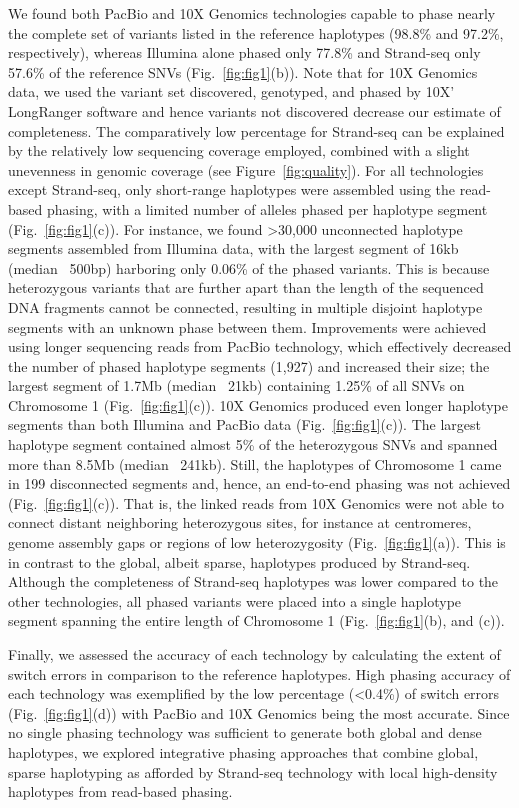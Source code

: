 	We found both PacBio and 10X Genomics technologies capable to phase nearly the complete set of variants listed in the reference haplotypes (98.8\% and 97.2\%, respectively), 
	whereas Illumina alone phased only 77.8\% and Strand-seq only 57.6\% of the reference SNVs (Fig.~\ref{fig:fig1}(b)). 
	Note that for 10X Genomics data, we used the variant set discovered, genotyped, and phased by 10X’ LongRanger software and hence variants not discovered decrease our estimate of completeness.
	The comparatively low percentage for Strand-seq can be explained by the relatively low sequencing coverage employed, combined with a slight unevenness in genomic coverage (see Figure~\ref{fig:quality}). 
	For all technologies except Strand-seq, only short-range haplotypes were assembled using the read-based phasing, with a limited number of alleles phased per haplotype segment (Fig.~\ref{fig:fig1}(c)). 
	For instance, we found >30,000 unconnected haplotype segments assembled from Illumina data, with the largest segment of 16kb (median ~500bp) harboring only 0.06\% of the phased variants. 
	This is because heterozygous variants that are further apart than the length of the sequenced DNA fragments cannot be connected, resulting in multiple disjoint haplotype segments with an unknown phase between them. 
	Improvements were achieved using longer sequencing reads from PacBio technology, which effectively decreased the number of phased haplotype segments (1,927) and increased their size; the largest segment of 1.7Mb (median ~21kb) 
	containing 1.25\% of all SNVs on Chromosome 1 (Fig.~\ref{fig:fig1}(c)). 10X Genomics produced even longer haplotype segments than both Illumina and PacBio data (Fig.~\ref{fig:fig1}(c)). 
	The largest haplotype segment contained almost 5\% of the heterozygous SNVs and spanned more than 8.5Mb (median ~241kb). Still, the haplotypes of Chromosome 1 came in 199 disconnected segments and, 
	hence, an end-to-end phasing was not achieved (Fig.~\ref{fig:fig1}(c)). That is, the linked reads from 10X Genomics were not able to connect distant neighboring heterozygous sites, for instance at centromeres, 
	genome assembly gaps or regions of low heterozygosity (Fig.~\ref{fig:fig1}(a)). 
	This is in contrast to the global, albeit sparse, haplotypes produced by Strand-seq. 
	Although the completeness of Strand-seq haplotypes was lower compared to the other technologies, all phased variants were placed into a single haplotype segment spanning the entire length of Chromosome 1 (Fig.~\ref{fig:fig1}(b), and (c)).	
	
	Finally, we assessed the accuracy of each technology by calculating the extent of switch errors in comparison to the reference haplotypes. High phasing accuracy of each technology was exemplified by the low percentage (<0.4\%) 
	of switch errors (Fig.~\ref{fig:fig1}(d)) with PacBio and 10X Genomics being the most accurate. 
	Since no single phasing technology was sufficient to generate both global and dense haplotypes, 
	we explored integrative phasing approaches that combine global, sparse haplotyping as afforded by Strand-seq technology with local high-density haplotypes from read-based phasing.
	
